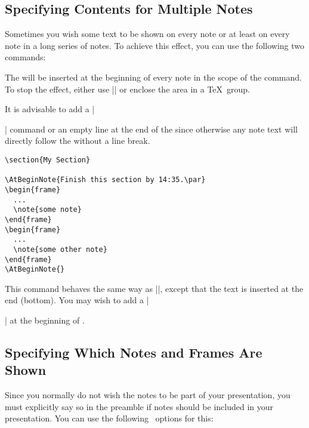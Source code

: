 \subsection{Specifying Contents for Multiple Notes}

Sometimes you wish some text to be shown on every note or at least on
every note in a long series of notes. To achieve this effect, you can use
the following two commands:

\begin{command}{\AtBeginNote{}}
  The  will be inserted at the beginning of every note in
  the scope of the command. To stop the effect, either use
  |\AtBeginNote{}| or enclose the area in a \TeX\ group.

  It is advisable to add a |\par| command or an empty line at the end
  of the  since otherwise any note text will directly
  follow the  without a line break.

  \example
\begin{verbatim}
\section{My Section}

\AtBeginNote{Finish this section by 14:35.\par}
\begin{frame}
  ...
  \note{some note}
\end{frame}
\begin{frame}
  ...
  \note{some other note}
\end{frame}
\AtBeginNote{}
\end{verbatim}
\end{command}

\begin{command}{\AtEndNote{}}
  This command behaves the same way as |\AtBeginNote|, except that the
  text is inserted at the end (bottom). You may wish to add a |\par|
  at the beginning of .
\end{command}


\subsection{Specifying Which Notes and Frames Are Shown}

Since you normally do not wish the notes to be part of your
presentation, you must explicitly say so in the preamble if notes
should be included in your presentation. You can use the following
\beamer\ options for this:

